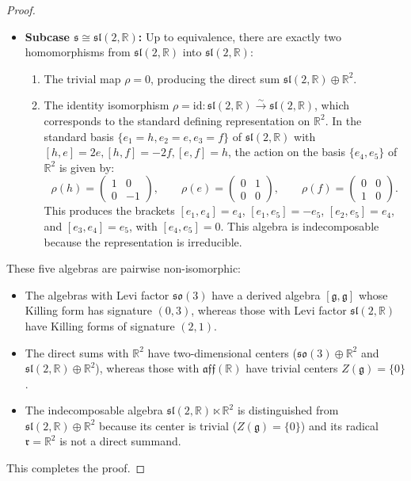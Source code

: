 \documentclass[11pt,a4paper]{article}
\theoremstyle{definition}
\theoremstyle{remark}
\newcommand{\R}{\mathbb{R}}
\newcommand{\g}{\mathfrak{g}}
\newcommand{\s}{\mathfrak{s}}
\newcommand{\rr}{\mathfrak{r}}
\begin{document}
\begin{proof}
\begin{itemize}
    \item \textbf{Subcase $\s \cong \mathfrak{sl}(2,\R)$:} Up to equivalence, there are exactly two homomorphisms from $\mathfrak{sl}(2,\R)$ into $\mathfrak{sl}(2,\R)$:
    \begin{enumerate}
        \item The trivial map $\rho = 0$, producing the direct sum $\mathfrak{sl}(2,\R) \oplus \R^2$.
        \item The identity isomorphism $\rho = \mathrm{id} \colon \mathfrak{sl}(2,\R) \xrightarrow{\sim} \mathfrak{sl}(2,\R)$, which corresponds to the standard defining representation on $\R^2$. In the standard basis $\{e_1 = h, e_2 = e, e_3 = f\}$ of $\mathfrak{sl}(2,\R)$ with $[h, e] = 2e, [h, f] = -2f, [e, f] = h$, the action on the basis $\{e_4, e_5\}$ of $\R^2$ is given by:
        \begin{equation}
            \rho(h) = \begin{pmatrix} 1 & 0 \\ 0 & -1 \end{pmatrix}, \qquad \rho(e) = \begin{pmatrix} 0 & 1 \\ 0 & 0 \end{pmatrix}, \qquad \rho(f) = \begin{pmatrix} 0 & 0 \\ 1 & 0 \end{pmatrix}.
        \end{equation}
        This produces the brackets $[e_1, e_4] = e_4$, $[e_1, e_5] = -e_5$, $[e_2, e_5] = e_4$, and $[e_3, e_4] = e_5$, with $[e_4, e_5] = 0$. This algebra is indecomposable because the representation is irreducible.
    \end{enumerate}
\end{itemize}

These five algebras are pairwise non-isomorphic:
\begin{itemize}
    \item The algebras with Levi factor $\mathfrak{so}(3)$ have a derived algebra $[\g, \g]$ whose Killing form has signature $(0, 3)$, whereas those with Levi factor $\mathfrak{sl}(2,\R)$ have Killing forms of signature $(2, 1)$.
    \item The direct sums with $\R^2$ have two-dimensional centers ($\mathfrak{so}(3) \oplus \R^2$ and $\mathfrak{sl}(2,\R) \oplus \R^2$), whereas those with $\mathfrak{aff}(\R)$ have trivial centers $Z(\g) = \{0\}$.
    \item The indecomposable algebra $\mathfrak{sl}(2,\R) \ltimes \R^2$ is distinguished from $\mathfrak{sl}(2,\R) \oplus \R^2$ because its center is trivial ($Z(\g) = \{0\}$) and its radical $\rr = \R^2$ is not a direct summand.
\end{itemize}
This completes the proof.
\end{proof}
\end{document}

